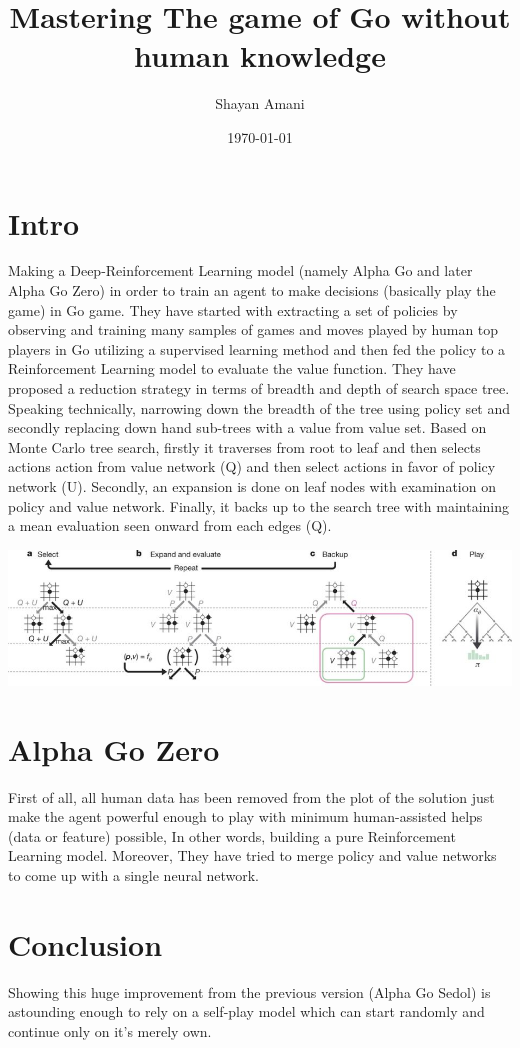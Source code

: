 \documentclass[a4paper,12pt]{article}
\title{Mastering The game of Go without human knowledge}
\author{Shayan Amani}
\date{\today}
\begin{document}
\maketitle

\section{Intro}
Making a Deep-Reinforcement Learning model (namely Alpha Go and later Alpha Go Zero) in order to train an agent to make decisions (basically play the game) in Go game. They have started with extracting a set of policies by observing and training many samples of games and moves played by human top players in Go utilizing a supervised learning method and then fed the policy to a Reinforcement Learning model to evaluate the value function. They have proposed a reduction strategy in terms of breadth and depth of search space tree. Speaking technically, narrowing down the breadth of the tree using policy set and secondly replacing down hand sub-trees with a value from value set. Based on Monte Carlo tree search, firstly it traverses from root to leaf and then selects actions action from value network (Q) and then select actions in favor of policy network (U). Secondly, an expansion is done on leaf nodes with examination on policy and value network. Finally, it backs up to the search tree with maintaining a mean evaluation seen onward from each edges (Q).
 
\includegraphics[scale=0.5]{tree.jpg}


\section{Alpha Go Zero}
First of all, all human data has been removed from the plot of the solution just make the agent powerful enough to play with minimum human-assisted helps (data or feature) possible, In other words, building a  pure Reinforcement Learning model. Moreover, They have tried to merge policy and value networks to come up with a single neural network. 

\section{Conclusion}
Showing this huge improvement from the previous version (Alpha Go Sedol) is astounding enough to rely on a self-play model which can start randomly and continue only on it's merely own.
 
\end{document}
